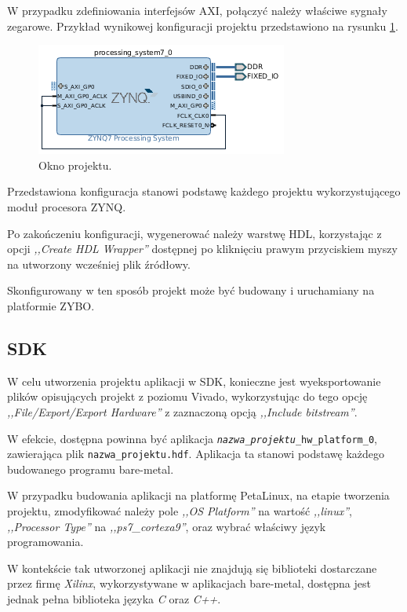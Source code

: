 W przypadku zdefiniowania interfejsów AXI, połączyć należy właściwe sygnały zegarowe. Przykład wynikowej konfiguracji projektu przedstawiono na rysunku \ref{fig:vivado-config-result}.

	\begin{figure}[ht]
		\centering
		\includegraphics[]{img/vivado/vivado-config-result.png}
		\caption{Okno projektu.}
		\label{fig:vivado-config-result}
	\end{figure}
	
Przedstawiona konfiguracja stanowi podstawę każdego projektu wykorzystującego moduł procesora ZYNQ.

Po zakończeniu konfiguracji, wygenerować należy warstwę HDL, korzystając z opcji \emph{,,Create HDL Wrapper''} dostępnej po kliknięciu prawym przyciskiem myszy na utworzony wcześniej plik źródłowy.

Skonfigurowany w ten sposób projekt może być budowany i uruchamiany na platformie ZYBO.
\subsection{SDK}

W celu utworzenia projektu aplikacji w SDK, konieczne jest wyeksportowanie plików opisujących projekt z poziomu Vivado, wykorzystując do tego opcję \emph{,,File/Export/Export Hardware''} z zaznaczoną opcją \emph{,,Include bitstream''}.

W efekcie, dostępna powinna być aplikacja \texttt{\textit{nazwa\_projektu}\_hw\_platform\_0}, zawierająca plik \texttt{nazwa\_projektu.hdf}. Aplikacja ta stanowi podstawę każdego budowanego programu bare-metal.

W przypadku budowania aplikacji na platformę PetaLinux, na etapie tworzenia projektu, zmodyfikować należy pole \emph{,,OS Platform''} na wartość \emph{,,linux''}, \emph{,,Processor Type''} na \emph{,,ps7\_cortexa9''}, oraz wybrać właściwy język programowania.

W kontekście tak utworzonej aplikacji nie znajdują się biblioteki dostarczane przez firmę \emph{Xilinx}, wykorzystywane w aplikacjach bare-metal, dostępna jest jednak pełna biblioteka języka \emph{C} oraz \emph{C++}.

